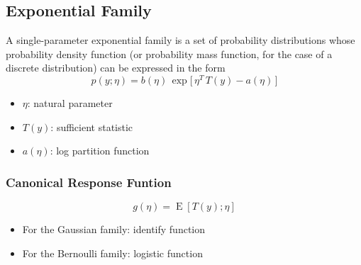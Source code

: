 \documentclass[8pt, a4paper, landscape, includeheadfoot]{extarticle}
\begin{document}
\begin{multicols*}{4}
\subsection{Exponential Family}
A single-parameter exponential family is a set of probability distributions 
whose probability density function (or probability mass function, for the case of a discrete distribution) can be expressed in the form
$$
p(y;\eta) = b(\eta)\,\exp\bigl[\,\eta^T \, T(y) - a(\eta)\,\bigr]
$$
\begin{itemize}[itemsep=0pt]
	\item $\eta$: natural parameter
	\item $T(y)$: sufficient statistic
	\item $a(\eta)$: log partition function
\end{itemize}

\subsubsection{Canonical Response Funtion}{}
$$
g(\eta) = \operatorname{E}[T(y);\eta]
$$
\begin{itemize}[itemsep=0pt]
	\item For the Gaussian family: identify function
	\item For the Bernoulli family: logistic function
\end{itemize}

\end{multicols*}
\end{document}
